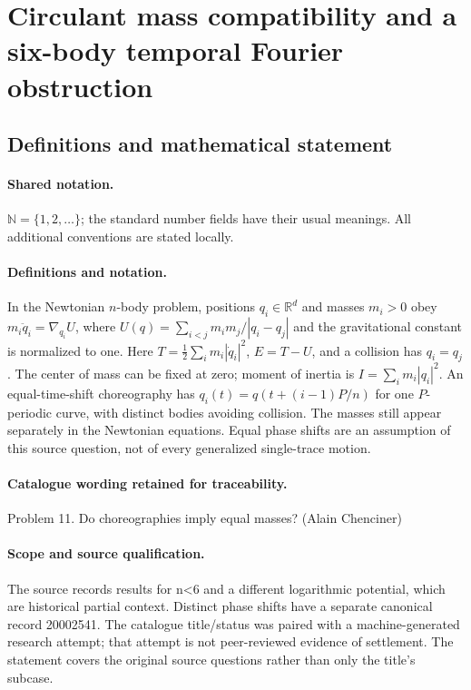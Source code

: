 \documentclass[11pt]{article}
\begin{document}
\section{Circulant mass compatibility and a six-body temporal Fourier obstruction}\label{statement}

\subsection{Definitions and mathematical statement}

\paragraph{Shared notation.}$\mathbb N=\{1,2,\ldots\}$; the standard number fields have their usual meanings. All additional conventions are stated locally.


\paragraph{Definitions and notation.}In the Newtonian $n$-body problem, positions $q_i\in\mathbb R^d$ and masses $m_i>0$ obey $m_i\ddot q_i=\nabla_{q_i}U$, where $U(q)=\sum_{i<j}m_im_j/|q_i-q_j|$ and the gravitational constant is normalized to one. Here $T=\tfrac12\sum_i m_i|\dot q_i|^2$, $E=T-U$, and a collision has $q_i=q_j$. The center of mass can be fixed at zero; moment of inertia is $I=\sum_i m_i|q_i|^2$. An equal-time-shift choreography has $q_i(t)=q(t+(i-1)P/n)$ for one $P$-periodic curve, with distinct bodies avoiding collision. The masses still appear separately in the Newtonian equations. Equal phase shifts are an assumption of this source question, not of every generalized single-trace motion.

\paragraph{Catalogue wording retained for traceability.}
Problem 11. Do choreographies imply equal masses? (Alain Chenciner)
\paragraph{Scope and source qualification.}The source records results for n<6 and a different logarithmic potential, which are historical partial context. Distinct phase shifts have a separate canonical record 20002541. The catalogue title/status was paired with a machine-generated research attempt; that attempt is not peer-reviewed evidence of settlement. The statement covers the original source questions rather than only the title’s subcase.
\end{document}
